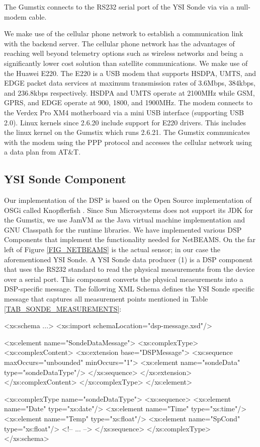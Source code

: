\documentclass[conference]{IEEEtran}
\begin{document}
The Gumstix connects to the RS232 serial port of the YSI Sonde via via a
null-modem cable.  

We make use of the cellular phone network to establish a communication
link with the backend server. The cellular phone network has the
advantages of reaching well beyond telemetry options such as wireless
networks and being a significantly lower cost solution than satellite
communications. We make use of the Huawei E220. The E220 is a USB
modem that supports HSDPA, UMTS, and EDGE packet data services at maximum
transmission rates of 3.6Mbps, 384kbps, and 236.8kbps respectively.
HSDPA and UMTS operate at 2100MHz while GSM, GPRS, and EDGE operate at
900, 1800, and 1900MHz. The modem connects to the Verdex Pro XM4
motherboard via a mini USB interface (supporting USB 2.0). Linux
kernels since 2.6.20 include support for E220 drivers.  This includes
the linux kernel on the Gumstix which runs 2.6.21.  The Gumstix
communicates with the modem using the PPP protocol and accesses the
cellular network using a data plan from AT\&T.



\subsection{YSI Sonde Component}

Our implementation of the DSP is based on the Open Source
implementation of OSGi called Knopflerfish \cite{knopflerfish01}. Since Sun
Microsystems does not support its JDK for the Gumstix, we use JamVM
\cite{jamvm01} as the Java virtual machine implementation and GNU Classpath
\cite{classpath01} for the runtime libraries. We have implemented various DSP
Components that implement the functionality needed for NetBEAMS. On
the far left of Figure \ref{FIG_NETBEAMS} is the actual sensor; in our
case the aforementioned YSI Sonde. A YSI Sonde data producer (1) is a DSP
component that uses the RS232 standard to read the physical measurements from
the device over a serial port. This component converts the physical measurements 
into a DSP-specific message. The following XML Schema defines the YSI Sonde
specific message that captures all measurement points mentioned in
Table \ref{TAB_SONDE_MEASUREMENTS}:

\begin{code}
<xs:schema ...>
<xs:import schemaLocation="dsp-message.xsd"/>

<xs:element name="SondeDataMessage">
  <xs:complexType>
    <xs:complexContent>
      <xs:extension base="DSPMessage">
        <xs:sequence maxOccurs="unbounded"
                     minOccurs="1">
          <xs:element name="sondeData"
                      type="sondeDataType"/>
        </xs:sequence>
      </xs:extension>
    </xs:complexContent>
  </xs:complexType>
</xs:element>

<xs:complexType name="sondeDataType">
  <xs:sequence>
    <xs:element name="Date" type="xs:date"/>
    <xs:element name="Time" type="xs:time"/>
    <xs:element name="Temp" type="xs:float"/>
    <xs:element name="SpCond" type="xs:float"/>
    <!-- ... -->
  </xs:sequence>
</xs:complexType>
</xs:schema>
\end{code}
\end{document}
